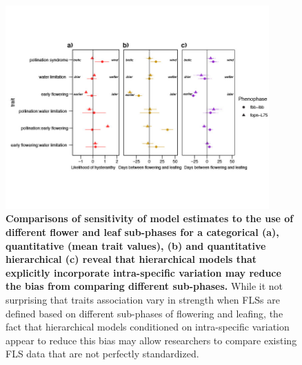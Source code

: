 \documentclass[11pt]{article}
\begin{document}
    
\begin{figure}[H]
\centering
\includegraphics[width=0.9\textwidth]{..//..//HFmodelplots4SUPP-01.jpg} 
  \caption{\textbf{Comparisons of sensitivity of model estimates to the use of different flower and leaf sub-phases for a categorical  \textbf{(a)}, quantitative (mean trait values), \textbf{(b)} and quantitative hierarchical \textbf{(c)} reveal that hierarchical models that explicitly incorporate intra-specific variation may reduce the bias from comparing different sub-phases.} While it not surprising that traits association vary in strength when FLSs are defined based on different sub-phases of flowering and leafing, the fact that hierarchical models conditioned on intra-specific variation appear to reduce this bias may allow researchers to compare existing FLS data that are not perfectly standardized.}
    \label{fig:sensitivity}
    \end{figure}
\end{document}
